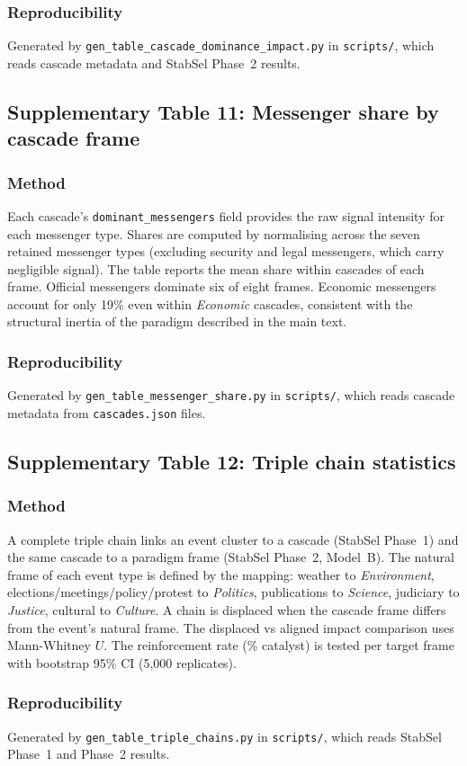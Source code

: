 \documentclass[11pt]{article}
\begin{document}
\subsubsection*{Reproducibility}
Generated by \texttt{gen\_table\_cascade\_dominance\_impact.py} in \texttt{scripts/},
which reads cascade metadata and StabSel Phase~2 results.


\newpage
\subsection*{Supplementary Table 11: Messenger share by cascade frame}



\subsubsection*{Method}
Each cascade's \texttt{dominant\_messengers} field provides the raw signal intensity for each messenger type. Shares are computed by normalising across the seven retained messenger types (excluding security and legal messengers, which carry negligible signal). The table reports the mean share within cascades of each frame. Official messengers dominate six of eight frames. Economic messengers account for only 19\% even within \emph{Economic} cascades, consistent with the structural inertia of the paradigm described in the main text.

\subsubsection*{Reproducibility}
Generated by \texttt{gen\_table\_messenger\_share.py} in \texttt{scripts/},
which reads cascade metadata from \texttt{cascades.json} files.


\newpage
\subsection*{Supplementary Table 12: Triple chain statistics}



\subsubsection*{Method}
A complete triple chain links an event cluster to a cascade (StabSel Phase~1) and the same cascade to a paradigm frame (StabSel Phase~2, Model~B). The natural frame of each event type is defined by the mapping: weather to \emph{Environment}, elections/meetings/policy/protest to \emph{Politics}, publications to \emph{Science}, judiciary to \emph{Justice}, cultural to \emph{Culture}. A chain is displaced when the cascade frame differs from the event's natural frame. The displaced vs aligned impact comparison uses Mann-Whitney $U$. The reinforcement rate (\% catalyst) is tested per target frame with bootstrap 95\% CI (5,000 replicates).

\subsubsection*{Reproducibility}
Generated by \texttt{gen\_table\_triple\_chains.py} in \texttt{scripts/},
which reads StabSel Phase~1 and Phase~2 results.

\endgroup
\end{document}
